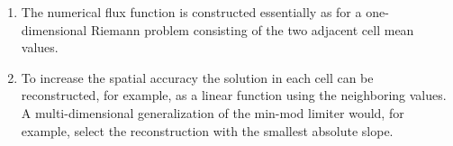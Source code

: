 \begin{remark}
	\begin{enumerate}
		\item The numerical flux function is constructed essentially as for a one-dimensional Riemann problem consisting of the two adjacent cell mean values.
		\begin{center}
		\end{center}
		\item To increase the spatial accuracy the solution in each cell can be reconstructed, for example, as a linear function using the neighboring values.
		A multi-dimensional generalization of the min-mod limiter would, for example, select the reconstruction with the smallest absolute slope.
	\end{enumerate}
\end{remark}

